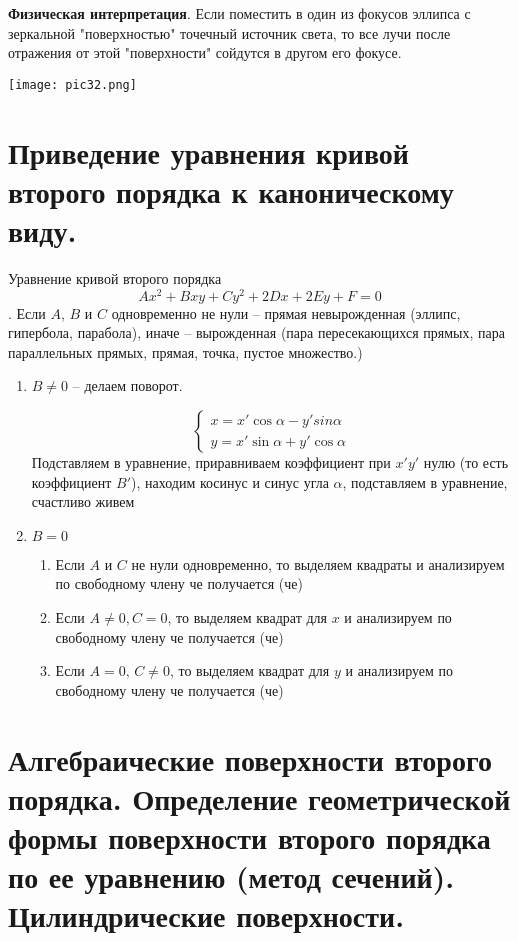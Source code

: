 \documentclass{article}
\begin{document}
\textbf{Физическая интерпретация}. Если поместить в один из фокусов эллипса с зеркальной "поверхностью" точечный источник света, то все лучи после отражения от этой "поверхности" сойдутся в другом его фокусе.
\begin{center}
    \texttt{[image: pic32.png]}
\end{center}
\newpage
\section{Приведение уравнения кривой второго порядка к каноническому виду.}
Уравнение кривой второго порядка $$ Ax^2+Bxy+Cy^2+2Dx+2Ey+F=0 $$. Если $A$, $B$ и $C$ одновременно не нули -- прямая невырожденная (эллипс, гипербола, парабола), иначе -- вырожденная (пара пересекающихся прямых, пара параллельных прямых,
прямая, точка, пустое множество.)

\begin{enumerate}
    \item $B\neq 0$ -- делаем поворот.

    $$ \begin{cases}x=x'\cos\alpha-y'sin\alpha \\ y=x'\sin\alpha+y'\cos\alpha \end{cases} $$
    Подставляем в уравнение, приравниваем коэффициент при $x'y'$  нулю (то есть коэффициент $B'$), находим косинус и синус угла $\alpha$, подставляем в уравнение, счастливо живем
    \item $B=0$
    \begin{enumerate}
        \item Если $A$ и $C$ не нули одновременно, то выделяем квадраты и анализируем по свободному члену че получается (че)
        \item Если $A\neq0,C=0$, то выделяем квадрат для $x$ и анализируем по свободному члену че получается (че)
        \item Если $A=0,\,C\neq0$, то выделяем квадрат для $y$ и анализируем по свободному члену че получается (че)
    \end{enumerate}
\end{enumerate}
\newpage
\section{Алгебраические поверхности второго порядка. Определение геометрической формы поверхности второго порядка по ее уравнению (метод сечений). Цилиндрические поверхности.}
\end{document}
